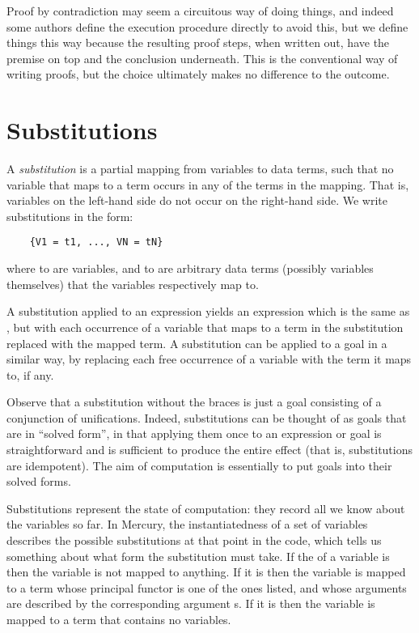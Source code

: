 Proof by contradiction
may seem a circuitous way of doing things,
and indeed some authors
define the execution procedure directly to avoid this,
but we define things this way
because the resulting proof steps, when written out,
have the premise on top and the conclusion underneath.
This is the conventional way of writing proofs,
but the choice ultimately makes no difference to the outcome.


\section{Substitutions}
\label{sec:substitutions}

A \emph{substitution\label{gi:substitution}}
is a partial mapping from variables to data terms,
such that no variable that maps to a term
occurs in any of the terms in the mapping.
That is, variables on the left-hand side
do not occur on the right-hand side.
We write substitutions in the form:
\begin{verbatim}
    {V1 = t1, ..., VN = tN}
\end{verbatim}
where  to  are variables,
and  to  are arbitrary data terms
(possibly variables themselves)
that the variables respectively map to.

A substitution applied to an expression 
yields an expression which is the same as ,
but with each occurrence of a variable
that maps to a term in the substitution
replaced with the mapped term.
A substitution can be applied to a goal in a similar way,
by replacing each free occurrence of a variable
with the term it maps to, if any.

Observe that a substitution without the braces
is just a goal consisting of a conjunction of unifications.
Indeed, substitutions can be thought of as
goals that are in ``solved form''\label{gi:solved-form},
in that applying them once to an expression or goal
is straightforward
and is sufficient to produce the entire effect
(that is, substitutions are idempotent).
The aim of computation is essentially to put goals into
their solved forms.

Substitutions represent the state of computation:
they record all we know about the variables so far.
In Mercury,
the instantiatedness of a set of variables
describes the possible substitutions at that point in the code,
which tells us something about
what form the substitution must take.
If the  of a variable is 
then the variable is not mapped to anything.
If it is  then the variable is mapped to
a term whose principal functor is one of the ones listed,
and whose arguments are described by
the corresponding argument s.
If it is  then the variable is mapped to
a term that contains no variables.

